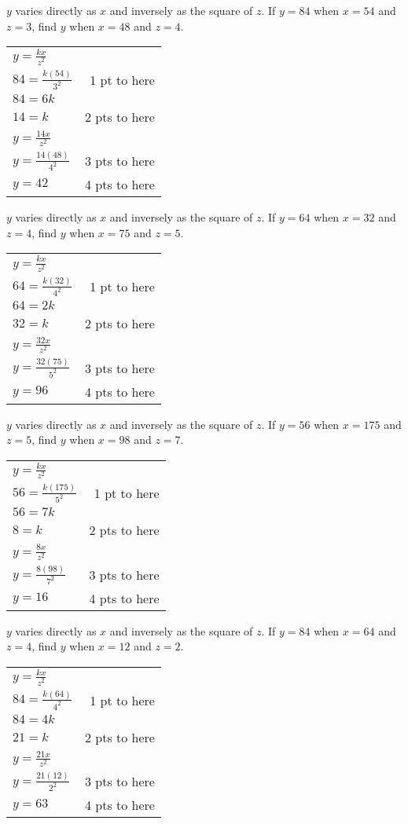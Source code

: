 {
	$y$ varies directly as $x$ and inversely as the square of $z$. If $y=84$ when $x=54$ and $z=3$, find $y$ when $x=48$ and $z=4$.
}
{
	\begin{tabular}{l r}
	$y=\frac{kx}{z^2}$ & \\
	$84=\frac{k(54)}{3^2}$ & 1 pt to here\\
	$84=6k$ & \\
	$14=k$ & 2 pts to here\\
	$y=\frac{14x}{z^2}$ &\\
	$y=\frac{14(48)}{4^2}$& 3 pts to here\\
	$y=42$ & 4 pts to here
	\end{tabular}
}

{
	$y$ varies directly as $x$ and inversely as the square of $z$. If $y=64$ when $x=32$ and $z=4$, find $y$ when $x=75$ and $z=5$.
}
{
	\begin{tabular}{l r}
	$y=\frac{kx}{z^2}$ & \\
	$64=\frac{k(32)}{4^2}$ & 1 pt to here\\
	$64=2k$ & \\
	$32=k$ & 2 pts to here\\
	$y=\frac{32x}{z^2}$ &\\
	$y=\frac{32(75)}{5^2}$& 3 pts to here\\
	$y=96$ & 4 pts to here
	\end{tabular}
}

{
	$y$ varies directly as $x$ and inversely as the square of $z$. If $y=56$ when $x=175$ and $z=5$, find $y$ when $x=98$ and $z=7$.
}
{
	\begin{tabular}{l r}
	$y=\frac{kx}{z^2}$ & \\
	$56=\frac{k(175)}{5^2}$ & 1 pt to here\\
	$56=7k$ & \\
	$8=k$ & 2 pts to here\\
	$y=\frac{8x}{z^2}$ &\\
	$y=\frac{8(98)}{7^2}$& 3 pts to here\\
	$y=16$ & 4 pts to here
	\end{tabular}
}

{
	$y$ varies directly as $x$ and inversely as the square of $z$. If $y=84$ when $x=64$ and $z=4$, find $y$ when $x=12$ and $z=2$.
}
{
	\begin{tabular}{l r}
	$y=\frac{kx}{z^2}$ & \\
	$84=\frac{k(64)}{4^2}$ & 1 pt to here\\
	$84=4k$ & \\
	$21=k$ & 2 pts to here\\
	$y=\frac{21x}{z^2}$ &\\
	$y=\frac{21(12)}{2^2}$& 3 pts to here\\
	$y=63$ & 4 pts to here
	\end{tabular}
}
